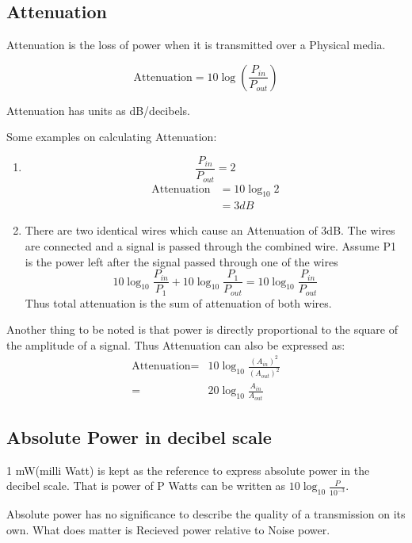 \documentclass[12pt]{article}
\begin{document}
\subsection{Attenuation}

Attenuation is the loss of power when it is transmitted over a Physical media. 

\[ \text{Attenuation} = 10 \log(\frac{P_{in}}{P_{out}})\]

Attenuation has units as dB/decibels. 

Some examples on calculating Attenuation:

\begin{enumerate}
    \item  \[\frac{P_{in}}{P_{out}} = 2 \]
    \begin{align*}
        \text{Attenuation} &= 10 \log_{10}2 \\
        &= 3dB 
    \end{align*}
    \item  There are two identical wires which cause an Attenuation of 3dB. 
    The wires are connected and a signal is passed through the combined wire. Assume P1 is the power left after the signal 
    passed through one of the wires
    \[10\log_{10}\frac{P_{in}}{P_1} + 10\log_{10}\frac{P_{1}}{P_{out}} = 10\log_{10}\frac{P_{in}}{P_{out}} \]
    Thus total attenuation is the sum of attenuation of both wires.
\end{enumerate}


Another thing to be noted is that power is directly proportional to the square of the amplitude of a signal. 
Thus Attenuation can also be expressed as:
\begin{align*}
    \text{Attenuation} =& 10 \log_{10} \frac{(A_{in})^2}{(A_{out})^2} \\
    =& 20 \log_{10} \frac{A_{in}}{A_{out}}
\end{align*}
        
\subsection{Absolute Power in decibel scale}

1 mW(milli Watt) is kept as the reference to express absolute power in the decibel scale. 
That is power of P Watts can be written as \(10\log_{10}\frac{P}{10^{-3}}\). 

Absolute power has no significance to describe the quality of a transmission on its own. What does matter is Recieved power relative to Noise power. 
\end{document}
